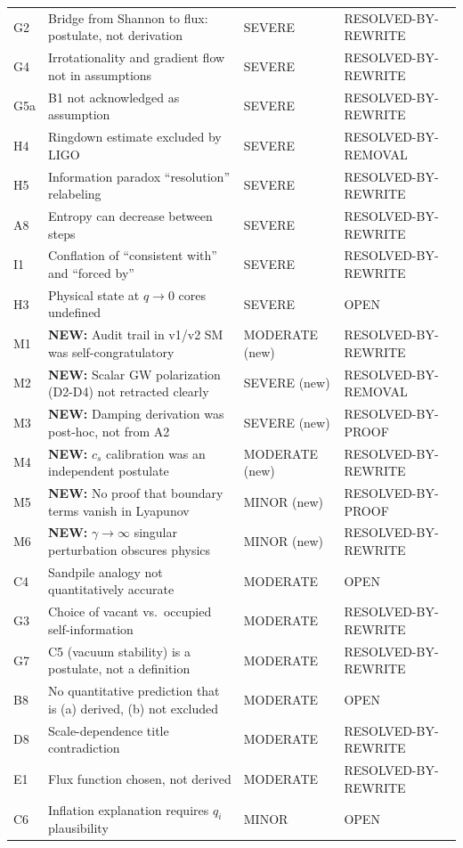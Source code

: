 \documentclass[reprint]{revtex4-2}
\begin{document}
\begin{table}[h]
\begin{tabular}{p{0.5cm}p{5.5cm}ll}
G2 & Bridge from Shannon to flux: postulate, not derivation & SEVERE & RESOLVED-BY-REWRITE \\
G4 & Irrotationality and gradient flow not in assumptions & SEVERE & RESOLVED-BY-REWRITE \\
G5a & B1 not acknowledged as assumption & SEVERE & RESOLVED-BY-REWRITE \\
H4 & Ringdown estimate excluded by LIGO & SEVERE & RESOLVED-BY-REMOVAL \\
H5 & Information paradox ``resolution'' relabeling & SEVERE & RESOLVED-BY-REWRITE \\
A8 & Entropy can decrease between steps & SEVERE & RESOLVED-BY-REWRITE \\
I1 & Conflation of ``consistent with'' and ``forced by'' & SEVERE & RESOLVED-BY-REWRITE \\
H3 & Physical state at $q\to 0$ cores undefined & SEVERE & OPEN \\
M1 & \textbf{NEW:} Audit trail in v1/v2 SM was self-congratulatory & MODERATE (new) & RESOLVED-BY-REWRITE \\
M2 & \textbf{NEW:} Scalar GW polarization (D2-D4) not retracted clearly & SEVERE (new) & RESOLVED-BY-REMOVAL \\
M3 & \textbf{NEW:} Damping derivation was post-hoc, not from A2 & SEVERE (new) & RESOLVED-BY-PROOF \\
M4 & \textbf{NEW:} $c_s$ calibration was an independent postulate & MODERATE (new) & RESOLVED-BY-REWRITE \\
M5 & \textbf{NEW:} No proof that boundary terms vanish in Lyapunov & MINOR (new) & RESOLVED-BY-PROOF \\
M6 & \textbf{NEW:} $\gamma\to\infty$ singular perturbation obscures physics & MINOR (new) & RESOLVED-BY-REWRITE \\
C4 & Sandpile analogy not quantitatively accurate & MODERATE & OPEN \\
G3 & Choice of vacant vs.\ occupied self-information & MODERATE & RESOLVED-BY-REWRITE \\
G7 & C5 (vacuum stability) is a postulate, not a definition & MODERATE & RESOLVED-BY-REWRITE \\
B8 & No quantitative prediction that is (a) derived, (b) not excluded & MODERATE & OPEN \\
D8 & Scale-dependence title contradiction & MODERATE & RESOLVED-BY-REWRITE \\
E1 & Flux function chosen, not derived & MODERATE & RESOLVED-BY-REWRITE \\
C6 & Inflation explanation requires $q_i$ plausibility & MINOR & OPEN \\
\bottomrule
\end{tabular}
\end{table}
\end{document}
